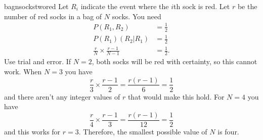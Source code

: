 \begin{answer}{bagnsockstwored}
Let $R_i$ indicate the event where the $i$th sock is red.
Let $r$ be the number of red socks in a bag of $N$ socks.
You need
\begin{align*}
  P(R_1,R_2)     &= \frac{1}{2} \\
  P(R_1)(R_2|R_1) &= \frac{1}{2} \\
  \frac{r}{N} \times
  \frac{r-1}{N-1}
   &=
  \frac{1}{2}
  \text{.}
\end{align*}
Use trial and error.
If $N=2$, both socks will be red with certainty, so this cannot work.
When $N=3$ you have
\[
  \frac{r}{3} \times
  \frac{r-1}{2}
   =
  \frac{r(r-1)}{6}
   =
  \frac{1}{2}
\]
and there aren't any integer values of $r$ that would make this hold.
For $N=4$ you have
\[
  \frac{r}{4} \times
  \frac{r-1}{3}
   =
  \frac{r(r-1)}{12}
   =
  \frac{1}{2}
\]
and this works for $r=3$.
Therefore, the smallest possible value of $N$ is four.
\end{answer}
